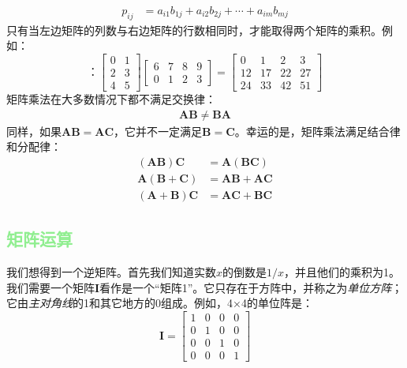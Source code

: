 \documentclass[lang=cn,12pt]{elegantbook}
\begin{document}
\begin{align}
p_{ij} & = a_{i1}b_{1j} + a_{i2}b_{2j}+ \cdots + a_{im}b_{mj}
\end{align}
只有当左边矩阵的列数与右边矩阵的行数相同时，才能取得两个矩阵的乘积。例如：
$$：\left[\begin{array}{ll}
0 & 1 \\
2 & 3 \\
4 & 5
\end{array}\right]\left[\begin{array}{llll}
6 & 7 & 8 & 9 \\
0 & 1 & 2 & 3
\end{array}\right]=\left[\begin{array}{rrrr}
0 & 1 & 2 & 3 \\
12 & 17 & 22 & 27 \\
24 & 33 & 42 & 51
\end{array}\right]
$$
矩阵乘法在大多数情况下都不满足交换律：
\begin{align}
\mathbf{AB} \neq \mathbf{BA}
\end{align}
同样，如果$\mathbf{AB} = \mathbf{AC}$，它并不一定满足$\mathbf{B} = \mathbf{C}$。幸运的是，矩阵乘法满足结合律和分配律：
$$
\begin{aligned}
(\mathbf{A B}) \mathbf{C} & =\mathbf{A}(\mathbf{B C}) \\
\mathbf{A}(\mathbf{B}+\mathbf{C}) & =\mathbf{A B}+\mathbf{A C} \\
(\mathbf{A}+\mathbf{B}) \mathbf{C} & =\mathbf{A C}+\mathbf{B C}
\end{aligned}
$$

\subsection{\textcolor{lightgreen}{矩阵运算}}

我们想得到一个逆矩阵。首先我们知道实数$x$的倒数是$1/x$，并且他们的乘积为1。我们需要一个矩阵$\mathbf{I}$看作是一个“矩阵1”。它只存在于方阵中，并称之为\textit{单位方阵}；它由\textit{主对角线}的1和其它地方的0组成。例如，4×4的单位阵是：
$$
\mathbf{I}=\left[\begin{array}{llll}
1 & 0 & 0 & 0 \\
0 & 1 & 0 & 0 \\
0 & 0 & 1 & 0 \\
0 & 0 & 0 & 1
\end{array}\right]
$$
\end{document}
